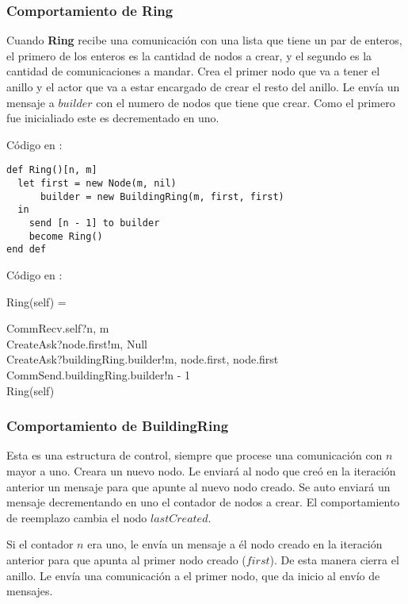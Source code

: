\subsubsection*{Comportamiento de Ring}

Cuando \textbf{Ring} recibe una comunicación con una lista que tiene un par de enteros, el primero de los enteros es la cantidad de nodos a crear, y el segundo es la cantidad de comunicaciones a mandar. Crea el primer nodo que va a tener el anillo y el actor que va a estar encargado de crear el resto del anillo. Le envía un mensaje a $builder$ con el numero de nodos que tiene que crear. Como el primero fue inicialiado este es decrementado en uno.

Código en \SAL:

\begin{lstlisting}[language=sal, style=simple]
def Ring()[n, m]
  let first = new Node(m, nil)
      builder = new BuildingRing(m, first, first) 
  in
    send [n - 1] to builder
    become Ring() 
end def
\end{lstlisting}

Código en \CSP:

\begin{process}
Ring(self) = \\ \quad
  \begin{block}
  CommRecv.self?\langle n, m \rangle \then \\
  CreateAsk?node.first!\langle m, Null \rangle \then \\
  CreateAsk?buildingRing.builder!\langle m, node.first, node.first \rangle \then \\
  CommSend.buildingRing.builder!\langle n - 1\rangle \then \\
  Ring(self)
  \end{block}
\end{process}

\subsubsection*{Comportamiento de BuildingRing}

Esta es una estructura de control, siempre que procese una comunicación con $n$ mayor a uno. Creara un nuevo nodo. Le enviará al nodo que creó en la iteración anterior un mensaje para que apunte al nuevo nodo creado. Se auto enviará un mensaje decrementando en uno el contador de nodos a crear. El comportamiento de reemplazo cambia el nodo $lastCreated$.

Si el contador $n$ era uno, le envía un mensaje a él nodo creado en la iteración anterior para que apunta al primer nodo creado ($first$). De esta manera cierra el anillo. Le envía una comunicación a el primer nodo, que da inicio al envío de mensajes. 

